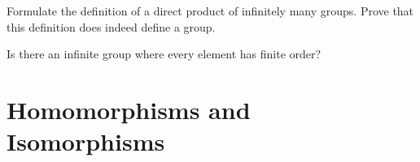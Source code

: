 \documentclass[./main.tex]{subfiles}
\begin{document}
\begin{exercise}
    Formulate the definition of a direct product of infinitely many groups.
    Prove that this definition does indeed define a group.
\end{exercise}

\begin{exercise}
    Is there an infinite group where every element has finite order?
\end{exercise}

\section{Homomorphisms and Isomorphisms}

\end{document}
